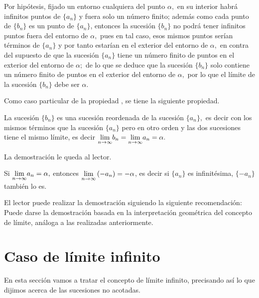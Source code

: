 \begin{dems}

Por hipótesis, fijado un entorno cualquiera del punto $\alpha,$ en
su interior habrá infinitos puntos de $\{a_{n}\}$ y fuera solo un
número finito; además como cada punto de $\{b_{n}\}$ es un punto
de $\{a_{n}\}$, entonces la sucesión $\{b_{n}\}$ no podrá tener
infinitos puntos fuera del entorno de $\alpha,$ pues en tal caso,
esos mismos puntos serían términos de $\{a_{n}\}$ y por tanto estarían
en el exterior del entorno de $\alpha,$ en contra del supuesto de
que la sucesión $\{a_{n}\}$ tiene un número finito de puntos en el
exterior del entorno de $\alpha;$ de lo que se deduce que la sucesión
$\{b_{n}\}$ solo contiene un número finito de puntos en el exterior
del entorno de $\alpha,$ por lo que el límite de la sucesión $\{b_{n}\}$
debe ser $\alpha.$

\end{dems}

Como caso particular de la propiedad , se
tiene la siguiente propiedad.

\begin{propiedad}{}

La sucesión $\{b_{n}\}$ es una sucesión reordenada de la sucesión
$\{a_{n}\},$ es decir con los mismos términos que la sucesión $\{a_{n}\}$
pero en otro orden y las dos sucesiones tiene el mismo límite, es
decir $\Lim{b_{n}}n{\infty}=\Lim{a_{n}}n{\infty}=\alpha.$ 

\end{propiedad}

La demostración le queda al lector.

\begin{propiedad}{}

Si $\Lim{a_{n}}n{\infty}=\alpha,$ entonces $\Lim{\left(-a_{n}\right)}n{\infty}=-\alpha$,
es decir si $\{a_{n}\}$ es infinitésima, $\{-a_{n}\}$ también lo
es.

\end{propiedad}

El lector puede realizar la demostración siguiendo la siguiente recomendación:
Puede darse la demostración basada en la interpretación geométrica
del concepto de límite, análoga a las realizadas anteriormente.

\section{Caso de límite infinito}

En esta sección vamos a tratar el concepto de límite infinito, precisando
así lo que dijimos acerca de las sucesiones no acotadas.

